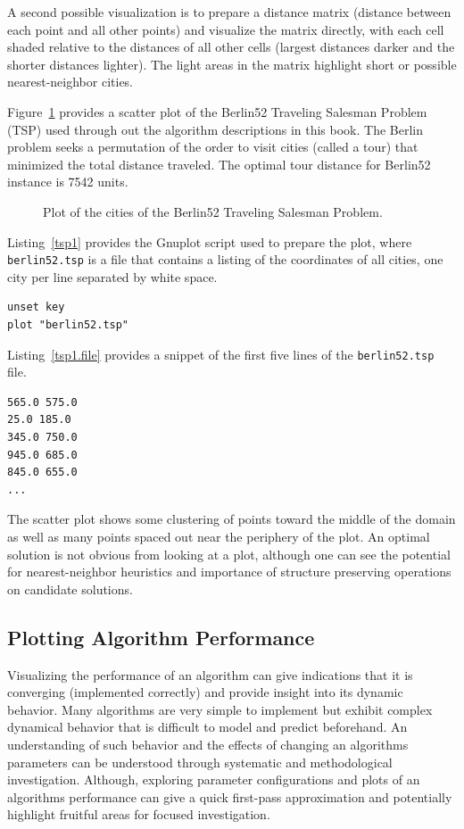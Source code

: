 A second possible visualization is to prepare a distance matrix (distance between each point and all other points) and visualize the matrix directly, with each cell shaded relative to the distances of all other cells (largest distances darker and the shorter distances lighter). The light areas in the matrix highlight short or possible nearest-neighbor cities.

Figure~\ref{plot:tsp1} provides a scatter plot of the Berlin52 Traveling Salesman Problem (TSP) used through out the algorithm descriptions in this book. The Berlin problem seeks a permutation of the order to visit cities (called a tour) that minimized the total distance traveled. The optimal tour distance for Berlin52 instance is 7542 units. 

\begin{figure}[htp]
\centering

\caption{Plot of the cities of the Berlin52 Traveling Salesman Problem.}
\label{plot:tsp1}
\end{figure}

Listing~\ref{tsp1} provides the Gnuplot script used to prepare the plot, where \texttt{berlin52.tsp} is a file that contains a listing of the coordinates of all cities, one city per line separated by white space. 

\begin{lstlisting}[caption=Gnuplot script for plotting the Berlin52 Traveling Salesman Problem., label=tsp1]
unset key
plot "berlin52.tsp"
\end{lstlisting}

Listing~\ref{tsp1.file} provides a snippet of the first five lines of the \texttt{berlin52.tsp} file.

\begin{lstlisting}[caption=Snippet of the berlin52.tsp file., label=tsp1.file]
565.0 575.0
25.0 185.0
345.0 750.0
945.0 685.0
845.0 655.0
...
\end{lstlisting}

The scatter plot shows some clustering of points toward the middle of the domain as well as many points spaced out near the periphery of the plot. An optimal solution is not obvious from looking at a plot, although one can see the potential for nearest-neighbor heuristics and importance of structure preserving operations on candidate solutions.

%
%
\subsection{Plotting Algorithm Performance}
Visualizing the performance of an algorithm can give indications that it is converging (implemented correctly) and provide insight into its dynamic behavior. Many algorithms are very simple to implement but exhibit complex dynamical behavior that is difficult to model and predict beforehand. An understanding of such behavior and the effects of changing an algorithms parameters can be understood through systematic and methodological investigation. Although, exploring parameter configurations and plots of an algorithms performance can give a quick first-pass approximation and potentially highlight fruitful areas for focused investigation.

